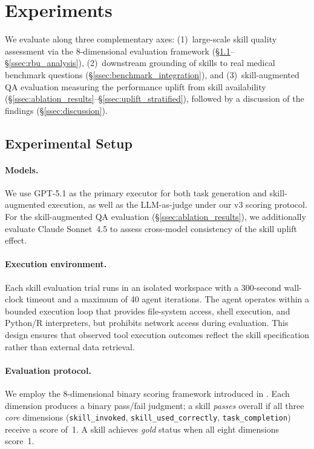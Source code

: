 
\section{Experiments}
\label{sec:experiments}

We evaluate \medskillbench along three complementary axes:
(1)~large-scale skill quality assessment via the 8-dimensional evaluation framework (\S\ref{ssec:setup}--\S\ref{ssec:rbu_analysis}),
(2)~downstream grounding of skills to real medical benchmark questions (\S\ref{ssec:benchmark_integration}), and
(3)~skill-augmented QA evaluation measuring the performance uplift from skill availability (\S\ref{ssec:ablation_results}--\S\ref{ssec:uplift_stratified}),
followed by a discussion of the findings (\S\ref{ssec:discussion}).

\subsection{Experimental Setup}
\label{ssec:setup}

\paragraph{Models.}
We use GPT-5.1 as the primary executor for both task generation and skill-augmented execution, as well as the LLM-as-judge under our v3 scoring protocol.
For the skill-augmented QA evaluation (\S\ref{ssec:ablation_results}), we additionally evaluate Claude Sonnet~4.5 to assess cross-model consistency of the skill uplift effect.

\paragraph{Execution environment.}
Each skill evaluation trial runs in an isolated workspace with a 300-second wall-clock timeout and a maximum of 40 agent iterations.
The agent operates within a bounded execution loop that provides file-system access, shell execution, and Python/R interpreters, but prohibits network access during evaluation.
This design ensures that observed tool execution outcomes reflect the skill specification rather than external data retrieval.

\paragraph{Evaluation protocol.}
We employ the 8-dimensional binary scoring framework introduced in .
Each dimension produces a binary pass/fail judgment; a skill \emph{passes} overall if all three \emph{core} dimensions (\texttt{skill\_invoked}, \texttt{skill\_used\_correctly}, \texttt{task\_completion}) receive a score of~1.
A skill achieves \emph{gold} status when all eight dimensions score~1.

